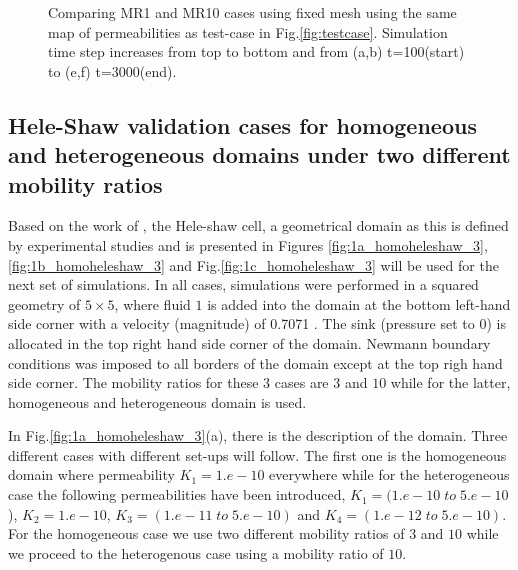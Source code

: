\documentclass[preprint,authoryear,12pt]{elsarticle}
\begin{document}
\begin{figure}[h]
{{}%
\hfill    
{}}%
\caption{Comparing MR1 and MR10 cases using fixed mesh using the same map of permeabilities as test-case in Fig.\ref{fig:testcase}. Simulation time step increases from top to bottom and from (a,b) t=100(start) to (e,f) t=3000(end).}
\label{fig:1testcase}
\end{figure}


\subsection{Hele-Shaw validation cases for homogeneous and heterogeneous domains under two different mobility ratios}

\medskip
Based on the work of \citet{saffman_1986}, the Hele-shaw cell, a geometrical domain as this is defined by experimental studies and is presented in Figures \ref{fig:1a_homoheleshaw_3},\ref{fig:1b_homoheleshaw_3} and Fig.\ref{fig:1c_homoheleshaw_3} will be used for the next set of simulations. In all cases, simulations were performed in a squared geometry of $5\times5$, where fluid $1$ is added into the domain at the bottom left-hand side corner with a velocity (magnitude) of 0.7071 %
. The sink (pressure set to $0$) is allocated in the top right hand side corner of the domain. Newmann boundary conditions %
was imposed to all borders of the domain except at the top righ hand side corner. The mobility ratios for these $3$ cases are $3$ and $10$ while for the latter, homogeneous and heterogeneous domain is used.

\medskip
In Fig.\ref{fig:1a_homoheleshaw_3}(a), there is the description of the domain. Three different cases with different set-ups will follow. The first one is the homogeneous domain where permeability $K_{1}=1.e-10$ everywhere while for the heterogeneous case the following permeabilities have been introduced, $K_{1}=(1.e-10 \;to\; 5.e-10$), $K_{2}=1.e-10$, $K_{3}=(1.e-11 \;to\; 5.e-10)$ and $K_{4}=(1.e-12 \;to\; 5.e-10)$. For the homogeneous case we use two different mobility ratios of $3$ and $10$ while we proceed to the heterogenous case using a mobility ratio of $10$. 
\end{document}

